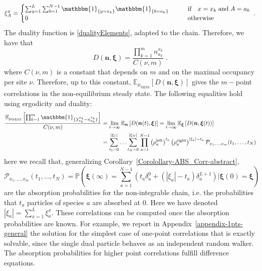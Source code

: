 \documentclass[10pt]{article}
\numberwithin{equation}{section}
\numberwithin{equation}{subsection}
\newcommand{\dt}{\;.}
\begin{document}
\begin{equation}
	\xi_{A}^{x}=	\begin{cases}
	\sum_{y=1}^{L}\sum_{b=1}^{N-1}\mathbbm{1}_{\{y=x_{k}\}}\mathbbm{1}_{\{b=a_{k}\}}\qquad &\text{if}\quad x=x_{k}\;\text{and} \; A=a_{k}\\
		 0\qquad &\text{otherwise}
	\end{cases}\dt
\end{equation}
The duality function is \eqref{dualityElements}, adapted to the chain. Therefore, we have that
\begin{equation}
	D(\bm{n},\bm{\xi})= \frac{\prod_{k=1}^{m}n_{a_{k}}^{x_{k}}}{C(\nu,m)}\dt
\end{equation}
where $C(\nu,m)$ is a constant that depends on $m$ and {\color{black} on the maximal occupancy} per site $\nu$. 
Therefore, up to this constant, $\mathbb{E}_{\mu_{\text{NESS}}}\left[D(\bm{n},\bm{\xi})\right]$ gives the $m-$point correlations in the non-equilibrium steady state. The following equalities hold using ergodicity and duality:
\begin{equation}\label{ExptationSS}
	\begin{split}
		\frac{\mathbb{E}_{\mu_{\text{NESS}}}\left[\prod_{k=1}^{m}\mathbbm{1}_{\{\mathcal{Y}_{a_{k}}^{x_{k}}=n_{a_{k}}^{x_{k}}\}}\right]}{C(\nu,m)}&=\lim_{t\to\infty}\mathbb{E}_{\bm{n}}\left[D(\bm{n}(t),\bm{\xi})\right]=\lim_{t\to\infty}\mathbb{E}_{\bm{\xi}}\left[D(\bm{n},\bm{\xi}(t))\right]
		\\&=
		\sum_{t_{1}=0}^{|\xi_{1}|}\ldots\sum_{t_{N}=0}^{|\xi_{N}|}\prod_{a=1}^{N-1}\left(\rho_{a}^{\text{left}}\right)^{t_{a}}\left(\rho_{a}^{\text{right}}\right)^{|\xi_{a}|-t_{a}}\mathcal{P}_{x_{1},\ldots,x_{m}}(t_{1},\ldots,t_{N})
	\end{split}
\end{equation}
here we recall that, generalizing Corollary~\ref{Corolollary-ABS_Corr-abstract}, %
\begin{equation}\label{Pass} 
	\mathcal{P}_{x_{1},\ldots,x_{m}}(t_{1},\ldots,t_{N})	=\mathbb{P}\left(\bm{\xi}(\infty)=\sum_{a=1}^{N-1}\left(t_{a}\delta_{a}^{0}+(|\xi_{a}|-t_{a})\delta_{a}^{L+1}\right)\Big|  \bm{\xi}(0)=\bm{\xi}\right)
\end{equation}
are the absorption probabilities for the non-integrable chain, i.e. the probabilities that $t_{a}$ particles of species $a$ are absorbed at $0$. Here we have denoted $|\xi_{a}|=\sum_{x=1}^{L}\xi_{a}^{x}$.
 These correlations can be computed once the absorption probabilities are known. For example, we report in Appendix~\ref{appendix-1pts-general} the solution for the simplest case of one-point correlations that is exactly solvable, since the single dual particle behaves as an independent random walker. 
 The absorption probabilities for higher point correlations fulfill  difference equations.
\end{document}
